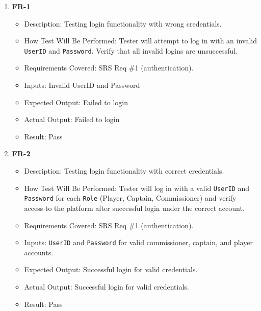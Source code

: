 \documentclass[12pt, titlepage]{article}
\begin{document}
\begin{enumerate}
    \item \textbf{FR-1}
          \begin{itemize}
              \item Description: Testing login functionality with wrong credentials.
              \item How Test Will Be Performed: Tester will attempt to log in with an invalid \texttt{UserID} and \texttt{Password}. Verify that all invalid logins are unsuccessful.
              \item Requirements Covered: SRS Req \#1 (authentication).
              \item Inputs: Invalid UserID and Password
              \item Expected Output: Failed to login
              \item Actual Output: Failed to login
              \item Result: Pass
          \end{itemize}

    \item \textbf{FR-2}
          \begin{itemize}
              \item Description: Testing login functionality with correct credentials.
              \item How Test Will Be Performed: Tester will log in with a valid \texttt{UserID} and \texttt{Password} for each \texttt{Role} (Player, Captain, Commissioner) and verify access to the platform after successful login under the correct account.
              \item Requirements Covered: SRS Req \#1 (authentication).
              \item Inputs: \texttt{UserID} and \texttt{Password} for valid commissioner, captain, and player accounts.
              \item Expected Output: Successful login for valid credentials.
              \item Actual Output: Successful login for valid credentials.
              \item Result: Pass
          \end{itemize}


\end{enumerate}
\end{document}
